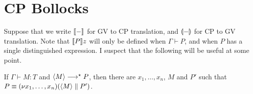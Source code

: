 \documentclass[orivec,envcountsame]{llncs}
\begin{document}

\section{CP Bollocks}

Suppose that we write $\llbracket - \rrbracket$ for GV to CP translation, and $\llparenthesis - \rrparenthesis$ for CP to GV translation.
Note that $\llbracket P \rrbracket z$ will only be defined when $\Gamma \vdash P$, and when $P$ has a single
distinguished expression.  I suspect that the following will be useful at some point.
\begin{lemma}
  If $\Gamma \vdash M: T$ and $\langle M \rangle \longrightarrow^\star P$, then there are $x_1,\dots,x_n$, $M$ and $P'$
  such that $P \equiv (\nu x_1,\dots,x_n)(\langle M \rangle \parallel P')$.
\end{lemma}
\end{document}
